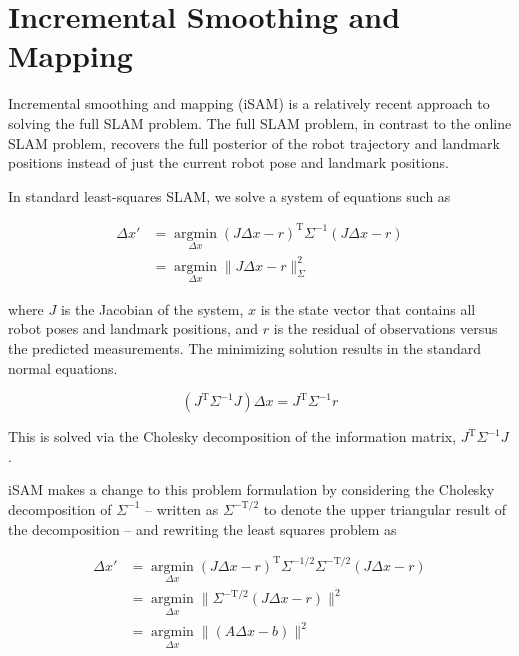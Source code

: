 \documentclass[conference]{IEEEtran}
\begin{document}
\section{Incremental Smoothing and Mapping}
\label{sec:incrementalsmoothingandmapping}


Incremental smoothing and mapping (iSAM) is a relatively recent approach to solving the
full SLAM problem. \cite{Kaess08tro} The full SLAM problem, in contrast to the online SLAM
problem, recovers the full posterior of the robot trajectory and landmark positions
instead of just the current robot pose and landmark positions. \cite{thrun2005probabilistic}

In standard least-squares SLAM, we solve a system of equations such as

\begin{align*}
  \Delta x' &= \underset{\Delta x}{\operatorname{argmin}} (J\Delta x - r)^{\text{T}}
\Sigma^{-1} (J\Delta x - r) \\
  &= \underset{\Delta x}{\operatorname{argmin}} \| J\Delta x - r \|^2_{\Sigma}
\end{align*}

where $J$ is the Jacobian of the system, $x$ is the state vector that contains all robot
poses and landmark positions, and $r$ is the residual of observations versus the predicted
measurements. The minimizing solution results in the standard normal equations.

\[
(J^{\text{T}} \Sigma^{-1} J) \Delta x = J^{\text{T}} \Sigma^{-1}r
\]

This is solved via the Cholesky decomposition of the information matrix,
$J^{\text{T}}\Sigma^{-1}J$.

iSAM makes a change to this problem formulation by considering the Cholesky decomposition
of $\Sigma^{-1}$ -- written as $\Sigma^{-\text{T}/2}$ to denote the upper triangular
result of the decomposition --  and rewriting the least squares problem as

\begin{align*}
    \Delta x' &= \underset{\Delta x}{\operatorname{argmin}} (J\Delta x - r)^{\text{T}}
\Sigma^{-1/2}\Sigma^{-\text{T}/2} (J\Delta x - r) \\
  &= \underset{\Delta x}{\operatorname{argmin}} \| \Sigma^{-\text{T}/2}(J\Delta x - r)
  \|^2\\
&= \underset{\Delta x}{\operatorname{argmin}} \| (A\Delta x - b)\|^2
\end{align*}
\end{document}
